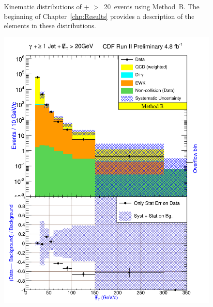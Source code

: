 \begin{figure}[h!]
\caption{Kinematic distributions of \phoonejet + \met$>$~20~\etUnits events using \mbox{Method B}. The beginning of Chapter~\ref{chp:Results} provides a description of the elements in these distributions.}
\label{fig:pjmetMtdBSetOne}
\end{figure}
\clearpage

\begin{figure}[h!]
\centering
{\includegraphics[keepaspectratio=true, scale=\resultsHistScale]{G30JetsMet20_MtdB_plot1_Met.pdf}}

\end{figure}
